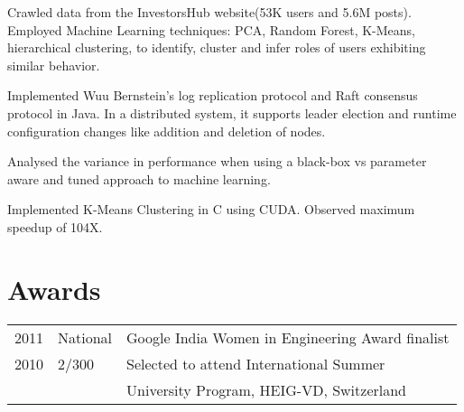 \documentclass[]{deedy-resume-openfont}
\begin{document}
\begin{minipage}[t]{0.63\textwidth}
{
 Crawled
data
from
the
InvestorsHub
website(53K users and 5.6M posts).
Employed
Machine
Learning
techniques:
PCA,
Random
Forest,
K-Means,
hierarchical
clustering,
to
identify,
cluster
and
infer
roles
of
users
exhibiting
similar
behavior.

\sectionsep

Implemented Wuu Bernstein’s log replication protocol and Raft consensus protocol in Java. In a distributed system, it supports leader election and runtime configuration changes like addition and deletion of nodes.
\sectionsep

Analysed the variance in performance when using a black-box vs parameter aware and tuned approach to machine learning. \sectionsep

Implemented K-Means Clustering in C using CUDA. Observed maximum speedup of 104X.

}
\section{Awards} 
\begin{tabular}{rll}
2011	     & National  & Google
India
Women
in
Engineering
Award finalist\\
2010 & 2/300 & Selected to attend International Summer\\  & & University Program, HEIG-VD, Switzerland\\
\end{tabular}

\end{minipage} 
\end{document}
